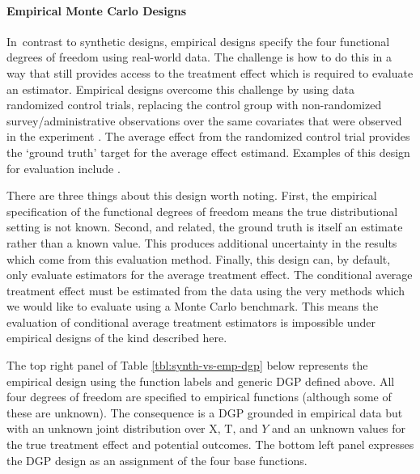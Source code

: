 \documentclass[../main.tex]{subfiles}
\begin{document}
\vspace{\baselineskip}
\paragraph*{Empirical Monte Carlo Designs}\par


\vspace{\baselineskip}
In\ contrast to synthetic designs, empirical designs specify the four functional degrees of freedom using real-world data. The challenge is how to do this in a way that still provides access to the treatment effect which is required to evaluate an estimator. Empirical designs overcome this challenge by using data randomized control trials, replacing the control group with non-randomized survey/administrative observations over the same covariates that were observed in the experiment \parencite{Huber2013TheScore}. The average effect from the randomized control trial provides the ‘ground truth’ target for the average effect estimand. Examples of this design for evaluation include \parencite{Lalonde1986EvaluatingData, Fraker1987ThePrograms, Friedlander1995EvaluatingMethods, Heckman1998MatchingEstimator, Dehejia1999CausalPrograms, Smith2005DoesEstimators, Flores2009EvaluatingData}.\par

\vspace{\baselineskip}

There are three things about this design worth noting. First, the empirical specification of the functional degrees of freedom means the true distributional setting is not known. Second, and related, the ground truth is itself an estimate rather than a known value. This produces additional uncertainty in the results which come from this evaluation method. Finally, this design can, by default, only evaluate estimators for the average treatment effect. The conditional average treatment effect must be estimated from the data using the very methods which we would like to evaluate using a Monte Carlo benchmark. This means the evaluation of conditional average treatment estimators is impossible under empirical designs of the kind described here.\par


\vspace{\baselineskip}
The top right panel of Table \ref{tbl:synth-vs-emp-dgp} below represents the empirical design using the function labels and generic DGP defined above. All four degrees of freedom are specified to empirical functions (although some of these are unknown). The consequence is a DGP grounded in empirical data but with an unknown joint distribution over  \( \text{X, T,} \) and  \( Y \) and an unknown values for the true treatment effect and potential outcomes. The bottom left panel expresses the \textcite{Lalonde1986EvaluatingData} DGP design as an assignment of the four base functions.\par
\end{document}
